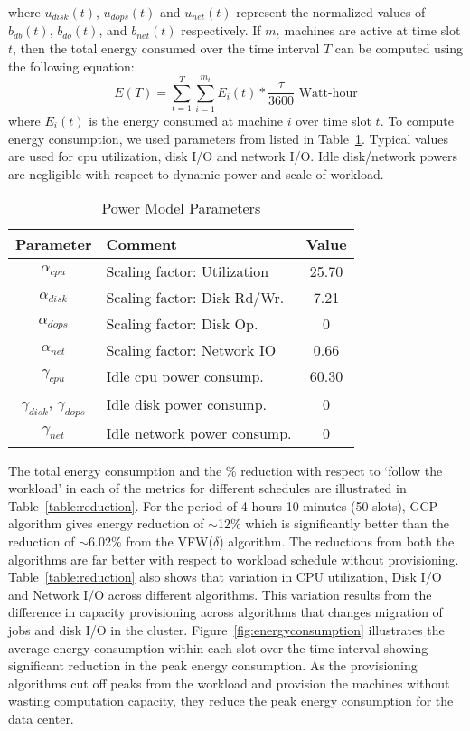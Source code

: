 \documentclass[10pt,conference,compsocconf,letterpaper]{IEEEtran}
\begin{document}
where $u_{disk}(t)$, $u_{dops}(t)$ and $u_{net}(t)$ represent the normalized values of $b_{db}(t)$, $b_{do}(t)$, and $b_{net}(t)$ respectively.
If $m_t$ machines are active at time slot $t$, then the total energy consumed over the time interval $T$ can be computed using the following equation:
\begin{equation}
E(T) = \sum_{t=1}^T \sum_{i=1}^{m_t} E_{i}(t) * \frac{\tau}{3600} \text{  Watt-hour}
\end{equation}
where $E_{i}(t)$ is the energy consumed at machine $i$ over time slot $t$. To compute energy consumption, we used parameters from \cite{n8} listed in Table~\ref{table:parameter}. Typical values are used for cpu utilization, disk I/O and network I/O. Idle disk/network powers are negligible with respect to dynamic power and scale of workload.



\begin{table}[!ht]
  \centering
  \caption{Power Model Parameters}
    \begin{tabular}{c|l|c}
    \hline\hline
    Parameter & Comment & Value   \\
    \hline
    $\alpha_{cpu}$ &  Scaling factor: Utilization    &   25.70      \\
    $\alpha_{disk}$ &   Scaling factor: Disk Rd/Wr.     &   7.21        \\
    $\alpha_{dops}$ &  Scaling factor: Disk Op.     &      0     \\
    $\alpha_{net}$ &  Scaling factor: Network IO     &      0.66      \\
    $\gamma_{cpu}$ &   Idle cpu power consump.    &    60.30         \\
    $\gamma_{disk}$, $\gamma_{dops}$ &  Idle disk power consump.    &    0      \\
    $\gamma_{net}$ &   Idle network power consump.   &        0    \\
    \hline
    \end{tabular}\label{table:parameter}\end{table}




The total energy consumption and the \% reduction with respect to `follow the workload' in each of the metrics for different schedules are illustrated in Table~\ref{table:reduction}. For the period of 4 hours 10 minutes (50 slots), GCP algorithm gives energy reduction of $\sim$12\% which is significantly better than the reduction of $\sim$6.02\% from the VFW($\delta$) algorithm. The reductions from both the algorithms are far better with respect to workload schedule without provisioning. Table~\ref{table:reduction} also shows that variation in CPU utilization, Disk I/O and Network I/O across different algorithms. This variation results from the difference in capacity provisioning across algorithms that changes migration of jobs and disk I/O in the cluster. Figure~\ref{fig:energyconsumption} illustrates the average energy consumption within each slot over the time interval showing significant reduction in the peak energy consumption. As the provisioning algorithms cut off peaks from the workload and provision the machines without wasting computation capacity, they reduce the peak energy consumption for the data center.
\end{document}
